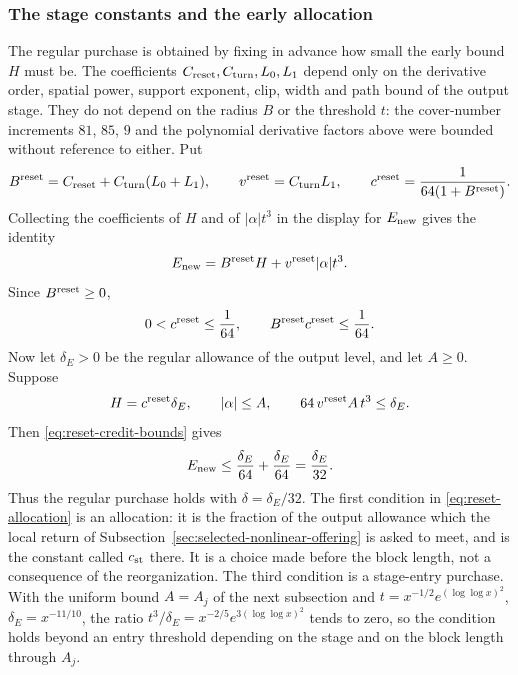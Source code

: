 \subsubsection{The stage constants and the early allocation}
The regular purchase is obtained by fixing in advance how small the
early bound $H$ must be. The coefficients
$C_{\rm reset},C_{\rm turn},L_0,L_1$ depend only on the derivative
order, spatial power, support exponent, clip, width and path bound
of the output stage. They do not depend on the radius $B$ or the
threshold $t$: the cover-number increments $81$, $85$, $9$ and the
polynomial derivative factors above were bounded without reference
to either. Put
\begin{equation}\label{eq:reset-stage-constants}
 B^{\rm reset}=C_{\rm reset}+C_{\rm turn}(L_0+L_1),\qquad
 v^{\rm reset}=C_{\rm turn}L_1,\qquad
 c^{\rm reset}=\frac1{64(1+B^{\rm reset})}.
\end{equation}
Collecting the coefficients of $H$ and of $|\alpha|t^3$ in the
display for $E_{\rm new}$ gives the identity
\[
 E_{\rm new}=B^{\rm reset}H+v^{\rm reset}|\alpha|t^3 .
\]
Since $B^{\rm reset}\ge0$,
\begin{equation}\label{eq:reset-credit-bounds}
 0<c^{\rm reset}\le\frac1{64},\qquad
 B^{\rm reset}c^{\rm reset}\le\frac1{64}.
\end{equation}
Now let $\delta_E>0$ be the regular allowance of the output level,
and let $A\ge0$. Suppose
\begin{equation}\label{eq:reset-allocation}
 H=c^{\rm reset}\delta_E,\qquad |\alpha|\le A,\qquad
 64\,v^{\rm reset}A\,t^3\le\delta_E .
\end{equation}
Then \eqref{eq:reset-credit-bounds} gives
\[
 E_{\rm new}\le\frac{\delta_E}{64}+\frac{\delta_E}{64}
           =\frac{\delta_E}{32}.
\]
Thus the regular purchase holds with $\delta=\delta_E/32$. The first
condition in \eqref{eq:reset-allocation} is an allocation: it is the
fraction of the output allowance which the local return of
Subsection~\ref{sec:selected-nonlinear-offering} is asked to meet, and
is the constant called $c_{\rm st}$ there. It is a choice made
before the block length, not a consequence of the reorganization.
The third condition is a stage-entry purchase. With the uniform
bound $A=A_j$ of the next subsection and
$t=x^{-1/2}e^{(\log\log x)^2}$, $\delta_E=x^{-11/10}$, the ratio
$t^3/\delta_E=x^{-2/5}e^{3(\log\log x)^2}$ tends to zero, so the
condition holds beyond an entry threshold depending on the stage
and on the block length through $A_j$.

